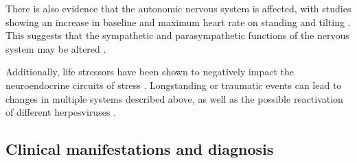 There is also evidence that the autonomic nervous system is affected, with studies showing an increase in baseline and maximum heart rate on standing and tilting \citep{freeman1997DoesChronic}.
This suggests that the sympathetic and parasympathetic functions of the nervous system may be altered \citep{goldstein2013BetrayalBrain}.

Additionally, life stressors have been shown to negatively impact the neuroendocrine circuits of stress \citep{stojanovich2008StressTrigger, bested2015ReviewMyalgic}.
Longstanding or traumatic events can lead to changes in multiple systems described above, as well as the possible reactivation of different herpesviruses \citep{segerstrom2004PsychologicalStress, kuratsune2008ChronicFatigue, rivera2019MyalgicEncephalomyelitis}.


\subsection{Clinical manifestations and diagnosis}
\label{subsec:sym-and-diagnosis}


